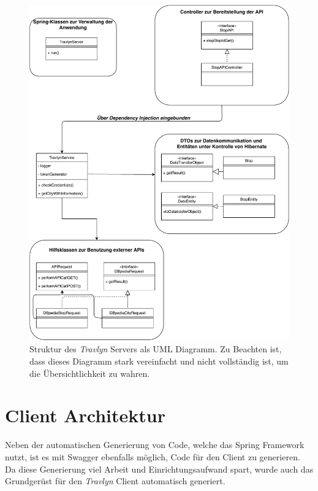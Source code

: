 	
	\begin{figure}[ht!]
		\centering
		\includegraphics[width=1\textwidth]{images/UML_Diagram.pdf}
		\caption{Struktur des \textit{Travlyn} Servers als UML Diagramm. Zu Beachten ist, dass dieses Diagramm stark vereinfacht und nicht vollständig ist, um die Übersichtlichkeit zu wahren.}
		\label{fig:UML}
	\end{figure}

	\clearpage

	\section{Client Architektur} %
		
		Neben der automatischen Generierung von Code, welche das Spring Framework nutzt, ist es mit Swagger ebenfalls möglich, Code für den Client zu generieren. Da diese Generierung viel Arbeit und Einrichtungsaufwand spart, wurde auch das Grundgerüst für den \textit{Travlyn} Client automatisch generiert.
		
